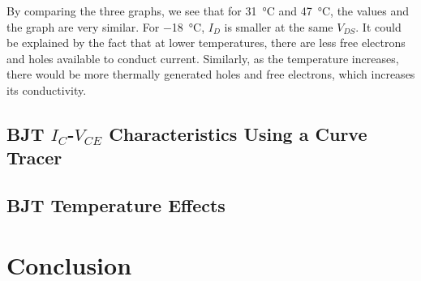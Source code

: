 \documentclass[journal]{IEEEtran}
\begin{document}
\par By comparing the three graphs, we see that for \SI{31}{\celsius} and
\SI{47}{\celsius}, the values and the graph are very similar. For
\SI{-18}{\celsius}, $I_{D}$ is smaller at the same $V_{DS}$. It could be
explained by the fact that at lower temperatures, there are less
free electrons and holes available to conduct current. Similarly,
as the temperature increases, there would be more thermally generated holes
and free electrons, which increases its conductivity.
\subsection{BJT $I_{C}$-$V_{CE}$ Characteristics Using a Curve Tracer}
\subsection{BJT Temperature Effects}
\section{Conclusion}
\end{document}
